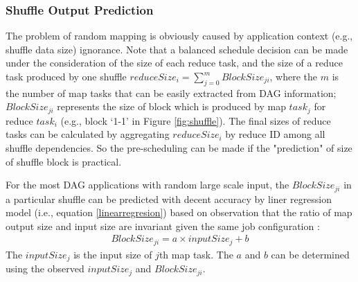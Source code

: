 \subsubsection{Shuffle Output Prediction}\label{shuffleprediction}
The problem of random mapping is obviously caused by application context (e.g., shuffle data size) ignorance. 
Note that a balanced schedule decision can be made under the consideration of the size of each reduce task, and the size of a reduce task produced by one shuffle $reduceSize_i = \sum_{j=0}^{m} {BlockSize_{ji}}$, 
where the $m$ is the number of map tasks that can be easily extracted from DAG information; 
$BlockSize_{ji}$ represents the size of block which is produced by map $task_j$ for reduce $task_i$ (e.g., block `1-1' in Figure \ref{fig:shuffle}). 
The final sizes of reduce tasks can be calculated by aggregating $reduceSize_i$ by reduce ID among all shuffle dependencies. 
So the pre-scheduling can be made if the "prediction" of size of shuffle block is practical.

For the most DAG applications with random large scale input, 
the $BlockSize_{ji}$ in a particular shuffle can be predicted with decent accuracy by liner regression model (i.e., equation \ref{linearregresion}) based on observation that the ratio of map output size and input size are invariant given the same job configuration \cite{guo2017ishuffle, predict}: 
\begin{equation}
\label{linearregresion}
\begin{aligned}
	BlockSize_{ji} = a \times inputSize_j + b
\end{aligned}
\end{equation}
The $inputSize_j$ is the input size of $j$th map task. 
The $a$ and $b$ can be determined using the observed $inputSize_j$ and $BlockSize_{ji}$.

